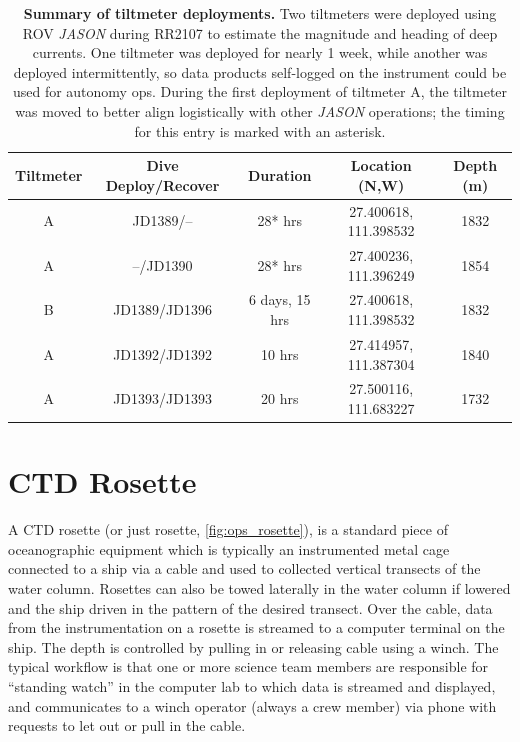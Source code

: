 \begin{table}[h!]
  \centering
  \begin{tabular}{c|c|c|c|c}
      Tiltmeter & Dive Deploy/Recover & Duration & Location (N,W) & Depth (m) \\
      \hline
      A & JD1389/-- & 28* hrs & 27.400618, 111.398532 & 1832 \\
      A & --/JD1390 & 28* hrs & 27.400236, 111.396249 & 1854 \\
      B & JD1389/JD1396 & 6 days, 15 hrs & 27.400618, 111.398532 & 1832 \\
      A & JD1392/JD1392 & 10 hrs & 27.414957, 111.387304 & 1840 \\
      A & JD1393/JD1393 & 20 hrs & 27.500116, 111.683227 & 1732 \\
  \end{tabular}
  \caption[Summary of tiltmeter deployments.]{\textbf{Summary of tiltmeter deployments.} Two tiltmeters were deployed using ROV \emph{JASON} during RR2107 to estimate the magnitude and heading of deep currents. One tiltmeter was deployed for nearly 1 week, while another was deployed intermittently, so data products self-logged on the instrument could be used for autonomy ops. During the first deployment of tiltmeter A, the tiltmeter was moved to better align logistically with other \emph{JASON} operations; the timing for this entry is marked with an asterisk.}
  \label{tab:ops_tilt}
\end{table}


\section{CTD Rosette}
A CTD rosette (or just rosette, \cref{fig:ops_rosette}), is a standard piece of oceanographic equipment which is typically an instrumented metal cage connected to a ship via a cable and used to collected vertical transects of the water column. Rosettes can also be towed laterally in the water column if lowered and the ship driven in the pattern of the desired transect. Over the cable, data from the instrumentation on a rosette is streamed to a computer terminal on the ship. The depth is controlled by pulling in or releasing cable using a winch. The typical workflow is that one or more science team members are responsible for ``standing watch'' in the computer lab to which data is streamed and displayed, and communicates to a winch operator (always a crew member) via phone with requests to let out or pull in the cable.

